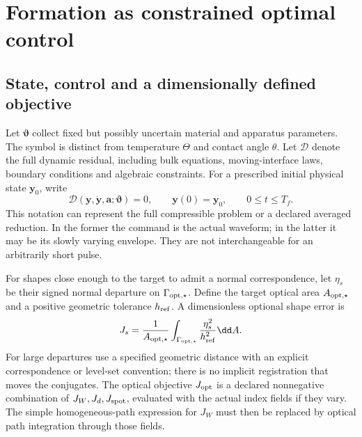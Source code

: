 \section{Formation as constrained optimal control}\label{sec:control}

\subsection{State, control and a dimensionally defined objective}
Let $\bm\vartheta$ collect fixed but possibly uncertain material and apparatus
parameters. The symbol is distinct from temperature $\Theta$ and contact angle
$\theta$. Let $\mathcal D$ denote the full dynamic residual, including bulk
equations, moving-interface laws, boundary conditions and algebraic constraints.
For a prescribed initial physical state $\bm y_0$, write
\begin{equation}
 \mathcal D(\bm y,\dot{\bm y},\bm a;\bm\vartheta)=0,
 \qquad \bm y(0)=\bm y_0,\qquad 0\leq t\leq T_f.
 \label{eq:dynamic-constraint}
\end{equation}
This notation can represent the full compressible problem or a declared
averaged reduction. In the former the command is the actual waveform; in the
latter it may be its slowly varying envelope. They are not interchangeable
for an arbitrarily short pulse.

For shapes close enough to the target to admit a normal correspondence, let
$\eta_s$ be their signed normal departure on $\Gamma_{\rm opt,\star}$. Define
the target optical area $A_{\rm opt,\star}$ and a positive geometric tolerance
$h_{\rm ref}$. A dimensionless optional shape error is
\begin{equation}
 J_s=\frac{1}{A_{\rm opt,\star}}
       \int_{\Gamma_{\rm opt,\star}}\frac{\eta_s^2}{h_{\rm ref}^2}\dd A.
 \label{eq:shape-cost}
\end{equation}
For large departures use a specified geometric distance with an explicit
correspondence or level-set convention; there is no implicit registration that
moves the conjugates. The optical objective $J_{\rm opt}$ is a declared
nonnegative combination of $J_W,J_d,J_{\rm spot}$, evaluated with the actual
index fields if they vary. The simple homogeneous-path expression for $J_W$
must then be replaced by optical path integration through those fields.

